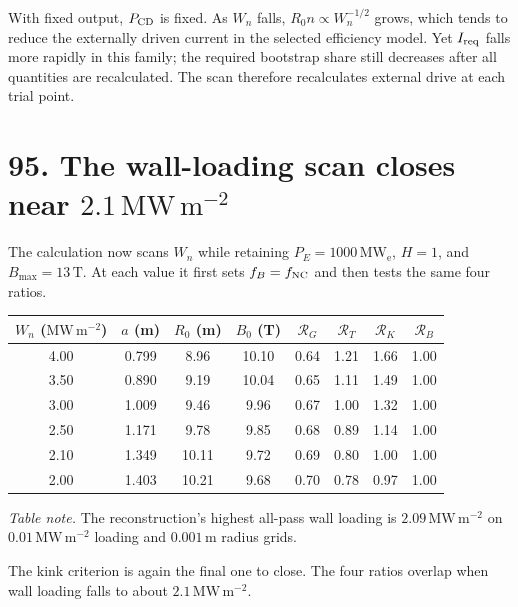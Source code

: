 \documentclass[11pt]{article}
\begin{document}
With fixed output,
$P_{\rm CD}$ is fixed. As $W_n$ falls, $R_0n\propto W_n^{-1/2}$ grows, which tends to
reduce the externally driven current in the selected efficiency model. Yet
$I_{\rm req}$ falls more rapidly in this family; the required bootstrap share still
decreases after all quantities are recalculated. The scan therefore recalculates external drive at each trial point.

\section*{95. The wall-loading scan closes near $2.1\,\mathrm{MW\,m^{-2}}$}

The calculation now scans $W_n$ while retaining $P_E=1000\,\mathrm{MW_e}$,
$H=1$, and $B_{\max}=13\,\mathrm T$. At each value it first sets
$f_B=f_{\rm NC}$ and then tests the same four ratios.

\par\noindent\begin{minipage}{\linewidth}
\begin{center}
\begin{tabular}{c c c c c c c c}
$W_n$ ($\mathrm{MW\,m^{-2}}$) & $a$ (m) & $R_0$ (m) & $B_0$ (T)
& $\mathcal R_G$ & $\mathcal R_T$ & $\mathcal R_K$ & $\mathcal R_B$\\
\hline
4.00 & 0.799 & 8.96 & 10.10 & 0.64 & 1.21 & 1.66 & 1.00\\
3.50 & 0.890 & 9.19 & 10.04 & 0.65 & 1.11 & 1.49 & 1.00\\
3.00 & 1.009 & 9.46 & 9.96 & 0.67 & 1.00 & 1.32 & 1.00\\
2.50 & 1.171 & 9.78 & 9.85 & 0.68 & 0.89 & 1.14 & 1.00\\
2.10 & 1.349 & 10.11 & 9.72 & 0.69 & 0.80 & 1.00 & 1.00\\
2.00 & 1.403 & 10.21 & 9.68 & 0.70 & 0.78 & 0.97 & 1.00
\end{tabular}
\end{center}
{\small\textit{Table note.} The reconstruction's highest all-pass wall loading is
$2.09\,\mathrm{MW\,m^{-2}}$ on $0.01\,\mathrm{MW\,m^{-2}}$ loading and
$0.001\,\mathrm m$ radius grids.\par}
\end{minipage}\par


The kink criterion is again the final one to close. The four ratios overlap when
wall loading falls to about $2.1\,\mathrm{MW\,m^{-2}}$.
\end{document}
